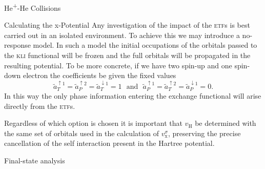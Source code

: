 \documentclass[letterpaper, 11 pt]{report}
\begin{document}
\begin{chapter}{\texorpdfstring{He\textsuperscript{+}}{He+}-He Collisions \label{chap:hephe}}
\begin{section}{Calculating the x-Potential \label{sec:pot}}
      Any investigation of the impact of the \textsc{etf}s is best carried out in an isolated
      environment. To achieve this we may introduce a no-response model. In such a model the initial
      occupations of the orbitals passed to the \textsc{kli} functional will be frozen and the full
      orbitals will be propagated in the resulting potential. To be more concrete, if we have two
      spin-up and one spin-down electron the coefficients be given the fixed values
      \begin{equation} \label{eq:noresp}
         \tilde{a}^{\uparrow 1}_T = \tilde{a}^{\uparrow 2}_P = \tilde{a}^{\downarrow 1}_T  = 1
         ~~~ \mbox{and} ~~~
         \tilde{a}^{\uparrow 1}_P = \tilde{a}^{\uparrow 2}_T = \tilde{a}^{\downarrow 1}_P  = 0.
      \end{equation}
      In this way the only phase information entering the exchange functional will arise directly from
      the \textsc{etf}s.

      Regardless of which option is chosen it is important that $v_\mathrm{H}$ be determined with the
      same set of orbitals used in the calculation of $v_\mathrm{x}^\sigma$, preserving the precise
      cancellation of the self interaction present in the Hartree potential.

   \end{section}

   \begin{subsection}{Final-state analysis \label{sec:hephe-det}}


\end{subsection}
\end{chapter}
\end{document}
